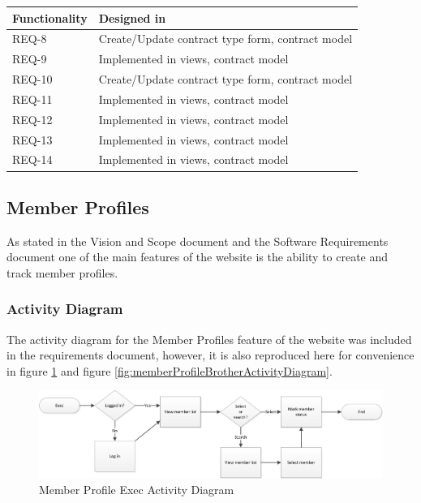 \documentclass{article}
\begin{document}
\FloatBarrier
\begin{table}
    \begin{tabular}{|l|l|}
        \hline
        Functionality & Designed in                                      \\ \hline
        REQ-8         & Create/Update contract type form, contract model \\ 
        REQ-9         & Implemented in views, contract model             \\ 
        REQ-10        & Create/Update contract type form, contract model \\ 
        REQ-11        & Implemented in views, contract model             \\ 
        REQ-12        & Implemented in views, contract model             \\ 
        REQ-13        & Implemented in views, contract model             \\ 
        REQ-14        & Implemented in views, contract model             \\
        \hline
    \end{tabular}
\end{table}
\FloatBarrier


\subsection{Member Profiles}

As stated in the Vision and Scope document and the Software Requirements document one of the main features of the website is the ability to create and track member profiles.

\subsubsection{Activity Diagram}
The activity diagram for the Member Profiles feature of the website was included in the requirements document, however, it is also reproduced here for convenience in figure \ref{fig:memberProfileExecActivityDiagram} and  figure \ref{fig:memberProfileBrotherActivityDiagram}.

\FloatBarrier
\begin{figure}
\centering
\includegraphics[scale=.65]{img/activityDiagrams/memberProfileActivity1}
\caption{Member Profile Exec Activity Diagram}
\label{fig:memberProfileExecActivityDiagram}
\end{figure}
\FloatBarrier
\end{document}
